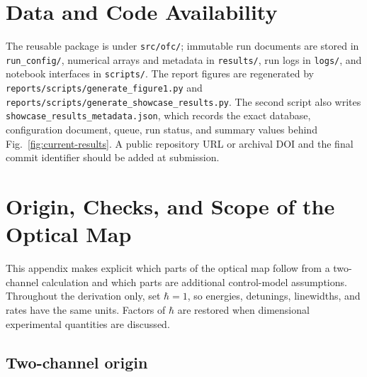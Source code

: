 \documentclass[9pt,a4paper,twocolumn,twoside]{rho-class/rho}
\begin{document}
\section*{Data and Code Availability}

    The reusable package is under \texttt{src/ofc/}; immutable run documents are
    stored in \texttt{run\_config/}, numerical arrays and metadata in
    \texttt{results/}, run logs in \texttt{logs/}, and notebook interfaces in
    \texttt{scripts/}. The report figures are regenerated by
    \texttt{reports/scripts/generate\_figure1.py} and
    \texttt{reports/scripts/generate\_showcase\_results.py}. The second script
    also writes \texttt{showcase\_results\_metadata.json}, which records the
    exact database, configuration document, queue, run status, and summary
    values behind Fig.~\ref{fig:current-results}. A public repository URL or
    archival DOI and the final commit identifier should be added at submission.

\appendix
\section{Origin, Checks, and Scope of the Optical Map}
\label{app:ofr-map}

    This appendix makes explicit which parts of the optical map follow from a
    two-channel calculation and which parts are additional control-model
    assumptions.  Throughout the derivation only, set $\hbar=1$, so energies,
    detunings, linewidths, and rates have the same units.  Factors of $\hbar$
    are restored when dimensional experimental quantities are discussed.

    \subsection{Two-channel origin}
\end{document}
